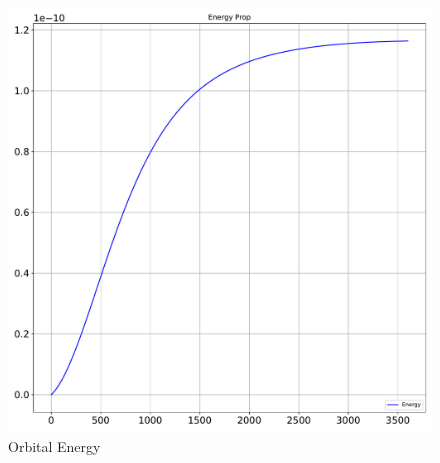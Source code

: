 \begin{figure}[htbp]\centerline{\includegraphics[height=0.9\textwidth, keepaspectratio]{AutoTeX/EnergyProp}}\caption{Orbital Energy}\label{fig:EnergyProp}\end{figure}
